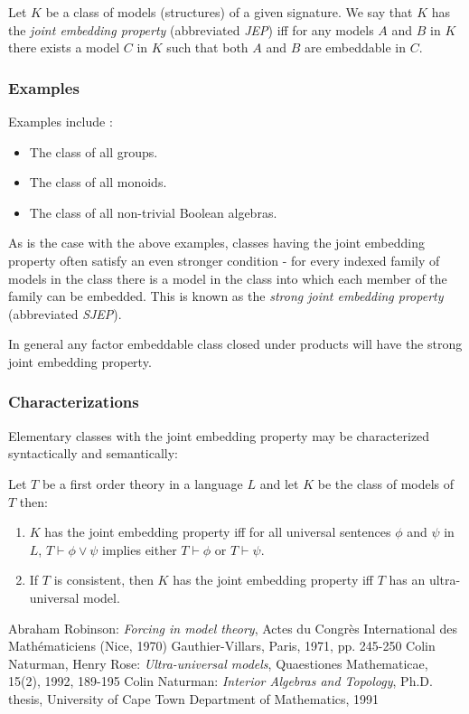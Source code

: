 \documentclass[12pt]{article}
\begin{document}
Let $K$ be a class of models (structures) of a given signature. We say that $K$ has the \emph{joint embedding property} (abbreviated \emph{JEP}) iff for any models $A$ and $B$ in $K$ there exists a model $C$ in $K$ such that both $A$ and $B$ are embeddable in $C$. \cite{FM, UM}

\subsubsection{Examples}
Examples include \cite{UM}:

\begin{itemize}
\item The class of all groups.
\item The class of all monoids.
\item The class of all non-trivial Boolean algebras.
\end{itemize}

As is the case with the above examples, classes having the joint embedding property often satisfy an even stronger condition - for every indexed family of models in the class there is a model in the class into which each member of the family can be embedded. This is known as the \emph{strong joint embedding property} (abbreviated \emph{SJEP}). \cite{IT}

In general any factor embeddable class closed under products will have the strong joint embedding property. \cite{UM}

\subsubsection{Characterizations}
Elementary classes with the joint embedding property may be characterized syntactically and semantically:

Let $T$ be a first order theory in a language $L$ and let $K$ be the class of models of $T$ then:

\begin{enumerate}
\item $K$ has the joint embedding property iff for all universal sentences $\phi$ and $\psi$ in $L$, $T\vdash\phi\vee\psi$ implies either $T\vdash\phi$ or $T\vdash\psi$. \cite{FM}
\item If $T$ is consistent, then $K$ has the joint embedding property iff $T$ has an ultra-universal model. \cite{UM}
\end{enumerate}

\begin{thebibliography}{1}
 Abraham Robinson: \emph{Forcing in model theory}, Actes du Congr\`es International des Math\'ematiciens (Nice, 1970) Gauthier-Villars, Paris, 1971, pp. 245-250
 Colin Naturman, Henry Rose: \emph{Ultra-universal models}, Quaestiones Mathematicae, 15(2), 1992, 189-195
 Colin Naturman: \emph{Interior Algebras and Topology}, Ph.D. thesis, University of Cape Town Department of Mathematics, 1991
\end{thebibliography}

\end{document}

